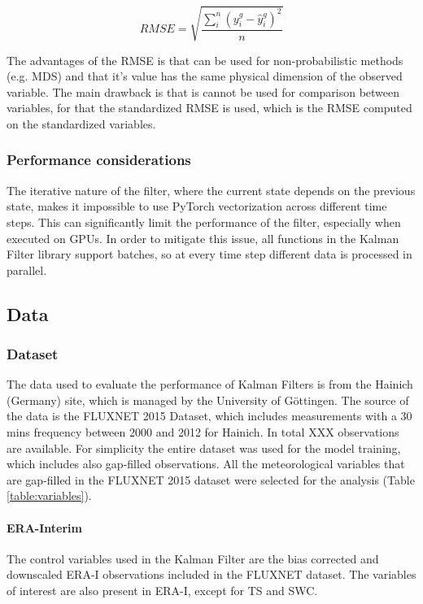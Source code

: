 \documentclass{article}
\let\Oldsubsection\subsection
\renewcommand{\subsection}{\FloatBarrier\Oldsubsection}
\begin{document}
\begin{equation}
    RMSE = \sqrt{\frac{\sum_i^n (y^g_i - \hat{y}^g_i)^2}{n}}
\end{equation}

The advantages of the RMSE is that can be used for non-probabilistic methods (e.g. MDS) and that it's value has the same physical dimension of the observed variable. The main drawback is that is cannot be used for comparison between variables, for that the standardized RMSE is used, which is the RMSE computed on the standardized variables.

\subsubsection{Performance considerations} 

The iterative nature of the filter, where the current state depends on the previous state, makes it impossible to use PyTorch vectorization across different time steps. This can significantly limit the performance of the filter, especially when executed on GPUs. In order to  mitigate this issue, all functions in the Kalman Filter library support batches, so at every time step different data is processed in parallel.


\subsection{Data}

\subsubsection{Dataset}

The data used to evaluate the performance of Kalman Filters is from the Hainich (Germany) site, which is managed by the University of Göttingen. The source of the data is  the FLUXNET 2015 Dataset, which includes measurements with a 30 mins frequency between 2000 and 2012 for Hainich. In total XXX observations are available. For simplicity the entire dataset was used for the model training, which includes also gap-filled observations.
All the meteorological variables that are gap-filled in the FLUXNET 2015 dataset were selected for the analysis (Table \ref{table:variables}).

\paragraph{ERA-Interim} The control variables used in the Kalman Filter are the bias corrected and downscaled ERA-I observations included in the FLUXNET dataset. The variables of interest are also present in ERA-I, except for TS and SWC.
\end{document}
